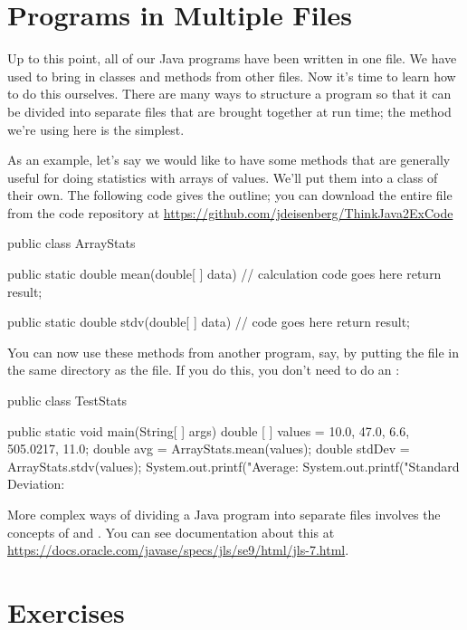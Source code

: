 \section{Programs in Multiple Files}
Up to this point, all of our Java programs have been written in one file. We have used  to bring in classes and methods from other files.  Now it’s time to learn how to do this ourselves. There are many ways to structure a program so that it can be divided into separate files that are brought together at run time; the method we're using here is the simplest.

As an example, let's say we would like to have some methods that are generally useful for doing statistics with arrays of  values. We'll put them into a  class of their own. The following code gives the outline; you can download the entire file from the code repository at \url{https://github.com/jdeisenberg/ThinkJava2ExCode}

\begin{code}
public class ArrayStats {

    public static double mean(double[ ] data) {
        // calculation code goes here
        return result;
    }
    
    public static double stdv(double[ ] data) {
        // code goes here
        return result;
    }
}
\end{code}

You can now use these methods from another program, say,  by putting the  file in the same directory as the  file.  If you do this, you don't need to do an :

\begin{code}
public class TestStats {

    public static void main(String[ ] args) {
        double [ ] values = {10.0, 47.0, 6.6, 505.0217, 11.0};
        double avg = ArrayStats.mean(values);
        double stdDev = ArrayStats.stdv(values);
        System.out.printf("Average: %
        System.out.printf("Standard Deviation: %
    }
}
\end{code}

More complex ways of dividing a Java program into separate files involves the concepts of  and . You can see documentation about this at \url{https://docs.oracle.com/javase/specs/jls/se9/html/jls-7.html}. 

\section{Exercises}

